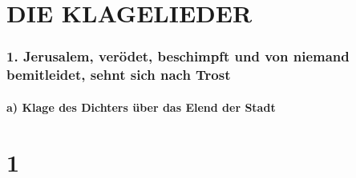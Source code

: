 \hypertarget{die-klagelieder}{%
\section{DIE KLAGELIEDER}\label{die-klagelieder}}

\hypertarget{jerusalem-veruxf6det-beschimpft-und-von-niemand-bemitleidet-sehnt-sich-nach-trost}{%
\subsubsection{1. Jerusalem, verödet, beschimpft und von niemand
bemitleidet, sehnt sich nach
Trost}\label{jerusalem-veruxf6det-beschimpft-und-von-niemand-bemitleidet-sehnt-sich-nach-trost}}

\hypertarget{a-klage-des-dichters-uxfcber-das-elend-der-stadt}{%
\paragraph{a) Klage des Dichters über das Elend der
Stadt}\label{a-klage-des-dichters-uxfcber-das-elend-der-stadt}}

\hypertarget{section}{%
\section{1}\label{section}}

